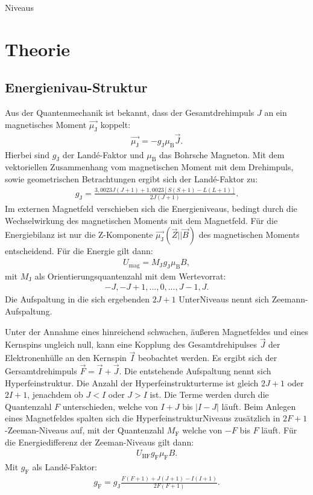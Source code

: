Niveaus\section{Theorie}
\label{sec:Theorie}
\subsection{Energienivau-Struktur}
Aus der Quantenmechanik ist bekannt, dass der Gesamtdrehimpuls $J$ an ein magnetisches Moment $\vec{\mu_\mathrm{J}}$
koppelt:
\begin{align}
  \vec{\mu_\mathrm{J}}=-g_\mathrm{J}\mu_\mathrm{B}\vec{J}.
\end{align}
Hierbei sind $g_\mathrm{J}$ der Landé-Faktor und $\mu_\mathrm{B}$ das Bohrsche Magneton.
Mit dem vektoriellen Zusammenhang vom magnetischen Moment mit dem Drehimpuls, sowie
geometrischen Betrachtungen ergibt sich der Landé-Faktor zu:
\begin{align}
  g_\mathrm{J}=\frac{3,0023J(J+1)+1,0023[S(S+1)-L(L+1)]}{2J(J+1)}.
\end{align}
Im externen Magnetfeld verschieben sich die Energieniveaus, bedingt durch  die Wechselwirkung des magnetischen
Moments mit dem Magnetfeld. Für die Energiebilanz ist nur die Z-Komponente $\vec{\mu_\mathrm{J}}(\vec{Z}||\vec{B})$ des magnetischen Moments
entscheidend.
Für die Energie gilt dann:
\begin{align}
  U_\mathrm{mag}=M_\mathrm{J}g_\mathrm{J}\mu_\mathrm{B}B,
\end{align}
mit $M_\mathrm{J}$ als Orientierungsquantenzahl mit dem Wertevorrat:
\begin{align}
  -J,-J+1,...,0,...,J-1,J.
\end{align}
Die Aufspaltung in die sich ergebenden $2J+1$ UnterNiveaus nennt sich Zeemann-Aufspaltung.

Unter der Annahme eines hinreichend schwachen, äußeren Magnetfeldes und eines Kernspins ungleich null, kann eine Kopplung des Gesamtdrehipulses $\vec{J}$ der
Elektronenhülle an den Kernspin $\vec{I}$ beobachtet werden. Es ergibt sich der Gersamtdrehimpuls $\vec{F}=\vec{I}+\vec{J}$.
Die entstehende Aufspaltung nennt sich Hyperfeinstruktur.
Die Anzahl der Hyperfeinstrukturterme ist gleich $2J+1$ oder $2I+1$, jenachdem ob $J<I$ oder $J>I$ ist.
Die Terme werden durch die Quantenzahl $F$ unterschieden, welche von $I+J$ bis $|I-J|$ läuft.
Beim Anlegen eines Magnetfeldes spalten sich die HyperfeinstrukturNiveaus zusätzlich in $2F+1$-Zeeman-Niveaus auf, mit der Quantenzahl $M_\mathrm{F}$
welche von $-F$ bis $F$ läuft.
Für die Energiedifferenz der Zeeman-Niveaus gilt dann:
\begin{align}
  U_\mathrm{HF}g_\mathrm{F}\mu_\mathrm{F}B.
\end{align}
Mit $g_\mathrm{F}$ als Landé-Faktor:
\begin{align}
  g_\mathrm{F}=g_\mathrm{J}\frac{F(F+1)+J(J+1)-I(I+1)}{2F(F+1)}.
\end{align}

